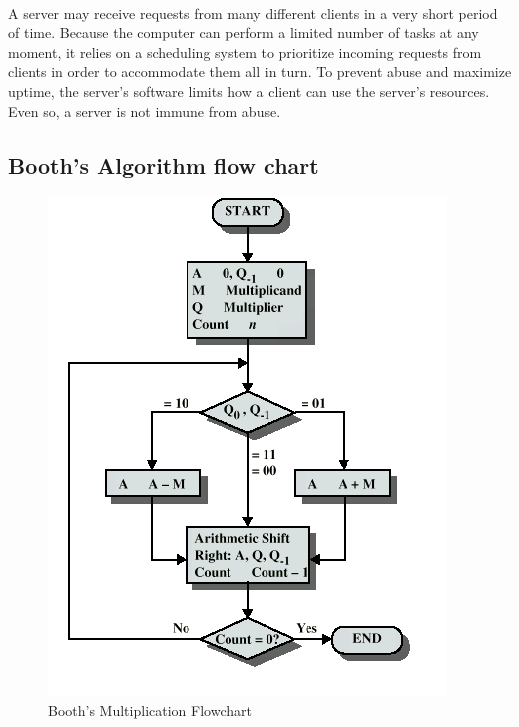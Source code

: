 \documentclass[a4paper,12pt]{article}
\begin{document}
		\paragraph{} A server may receive requests from many different clients in a very short period of time. Because the computer can perform a limited number of tasks at any moment, it relies on a scheduling system to prioritize incoming requests from clients in order to accommodate them all in turn. To prevent abuse and maximize uptime, the server's software limits how a client can use the server's resources. Even so, a server is not immune from abuse. 



\subsection{Booth's Algorithm flow chart}
		\begin{figure}[h!]
			\centering
			\includegraphics[scale=0.60]{booth}
			\caption{Booth's Multiplication Flowchart}
			
			\end{figure}
\end{document}

